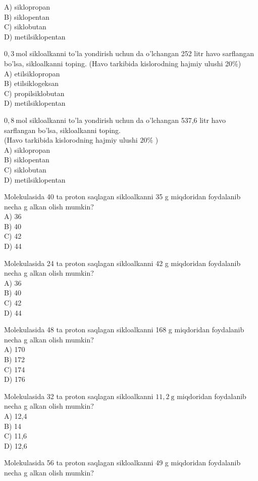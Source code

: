 A) siklopropan\\
B) siklopentan\\
C) siklobutan\\
D) metilsiklopentan
  \item $0,3 \mathrm{~mol}$ sikloalkanni to'la yondirish uchun da o'lchangan 252 litr havo sarflangan bo'lsa, sikloalkanni toping. (Havo tarkibida kislorodning hajmiy ulushi 20\%)\\
A) etilsiklopropan\\
B) etilsiklogeksan\\
C) propilsiklobutan\\
D) metilsiklopentan
  \item $0,8 \mathrm{~mol}$ sikloalkanni to'la yondirish uchun da o'lchangan 537,6 litr havo sarflangan bo'lsa, sikloalkanni toping.\\
(Havo tarkibida kislorodning hajmiy ulushi $20 \%$ )\\
A) siklopropan\\
B) siklopentan\\
C) siklobutan\\
D) metilsiklopentan
  \item Molekulasida 40 ta proton saqlagan sikloalkanni 35 g miqdoridan foydalanib necha g alkan olish mumkin?\\
A) 36\\
B) 40\\
C) 42\\
D) 44
  \item Molekulasida 24 ta proton saqlagan sikloalkanni 42 g miqdoridan foydalanib necha g alkan olish mumkin?\\
A) 36\\
B) 40\\
C) 42\\
D) 44
  \item Molekulasida 48 ta proton saqlagan sikloalkanni 168 g miqdoridan foydalanib necha g alkan olish mumkin?\\
A) 170\\
B) 172\\
C) 174\\
D) 176
  \item Molekulasida 32 ta proton saqlagan sikloalkanni $11,2 \mathrm{~g}$ miqdoridan foydalanib necha g alkan olish mumkin?\\
A) 12,4\\
B) 14\\
C) 11,6\\
D) 12,6
  \item Molekulasida 56 ta proton saqlagan sikloalkanni 49 g miqdoridan foydalanib necha g alkan olish mumkin?\\

